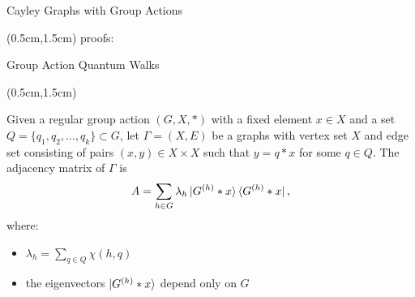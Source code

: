 \documentclass{beamer}
\theoremstyle{definition}
\begin{document}
\begin{frame}{Cayley Graphs with Group Actions}
    
    \begin{textblock*}{12cm}(0.5cm,1.5cm)
        proofs:

    \end{textblock*}

\end{frame}





\begin{frame}{Group Action Quantum Walks}
    
    \begin{textblock*}{12cm}(0.5cm,1.5cm)
               
        Given a regular group action $(G, X, *)$ with a fixed element $x \in X$ and a set  $Q = \{q_1, q_2, \dots, q_k\} \subset G$, let $\Gamma = (X, E)$ be a graphs with vertex set $X$ and edge set consisting of pairs $(x, y) \in X \times X$ such that $y = q * x$ for some $q \in Q$. The adjacency matrix of $\Gamma$ is
        \[ A = \sum_{h \in G} \lambda_h \ket{G^{(h)} * x} \bra{G^{(h)} * x}, \]
        where:
        \begin{itemize}
            \item $\lambda_h = \sum_{q \in Q} \chi(h, q)$
            \item the eigenvectors $\ket{G^{(h)} * x}$ depend only on $G$
        \end{itemize}

    \end{textblock*}

\end{frame}
\end{document}
